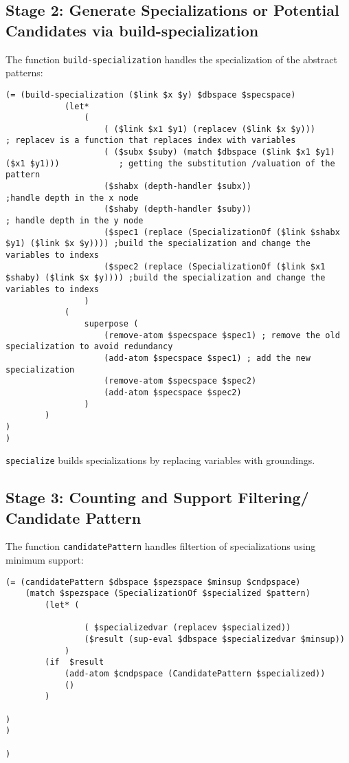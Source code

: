 \documentclass{article}
\begin{document}
\subsection{Stage 2: Generate Specializations or Potential Candidates via build-specialization}

The function \texttt{build-specialization} handles the specialization of the abstract patterns:

\begin{verbatim}
(= (build-specialization ($link $x $y) $dbspace $specspace) 
            (let*
                (
                    ( ($link $x1 $y1) (replacev ($link $x $y)))                            ; replacev is a function that replaces index with variables
                    ( ($subx $suby) (match $dbspace ($link $x1 $y1) ($x1 $y1)))            ; getting the substitution /valuation of the pattern
                    ($shabx (depth-handler $subx))                                    ;handle depth in the x node
                    ($shaby (depth-handler $suby))                                    ; handle depth in the y node
                    ($spec1 (replace (SpecializationOf ($link $shabx $y1) ($link $x $y)))) ;build the specialization and change the variables to indexs 
                    ($spec2 (replace (SpecializationOf ($link $x1 $shaby) ($link $x $y)))) ;build the specialization and change the variables to indexs
                )
            (
                superpose (
                    (remove-atom $specspace $spec1) ; remove the old specialization to avoid redundancy
                    (add-atom $specspace $spec1) ; add the new specialization
                    (remove-atom $specspace $spec2)
                    (add-atom $specspace $spec2)
                )
        )
)
)
\end{verbatim}

\texttt{specialize} builds specializations by replacing variables with groundings.

\subsection{Stage 3: Counting and Support Filtering/ Candidate Pattern}

The function \texttt{candidatePattern} handles filtertion of specializations using minimum support:

\begin{verbatim}
(= (candidatePattern $dbspace $spezspace $minsup $cndpspace)
    (match $spezspace (SpecializationOf $specialized $pattern)
        (let* (
                
                ( $specializedvar (replacev $specialized))
                ($result (sup-eval $dbspace $specializedvar $minsup))  
            )
        (if  $result 
            (add-atom $cndpspace (CandidatePattern $specialized))
            ()
        )

)
)

)
\end{verbatim}
\end{document}
